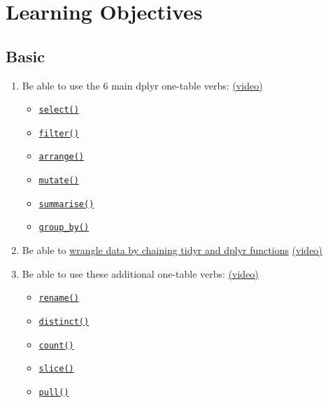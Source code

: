\documentclass[
  oneside]{book}
\providecommand{\tightlist}{%
  \setlength{\itemsep}{0pt}\setlength{\parskip}{0pt}}
\begin{document}
\hypertarget{ilo-dplyr}{%
\section{Learning Objectives}\label{ilo-dplyr}}

\hypertarget{basic-3}{%
\subsection{Basic}\label{basic-3}}

\begin{enumerate}
\def\labelenumi{\arabic{enumi}.}
\tightlist
\item
  Be able to use the 6 main dplyr one-table verbs: \href{https://youtu.be/l12tNKClTR0}{(video)}

  \begin{itemize}
  \tightlist
  \item
    \protect\hyperlink{select}{\texttt{select()}}
  \item
    \protect\hyperlink{filter}{\texttt{filter()}}
  \item
    \protect\hyperlink{arrange}{\texttt{arrange()}}
  \item
    \protect\hyperlink{mutate}{\texttt{mutate()}}
  \item
    \protect\hyperlink{summarise}{\texttt{summarise()}}
  \item
    \protect\hyperlink{group_by}{\texttt{group\_by()}}
  \end{itemize}
\item
  Be able to \protect\hyperlink{all-together}{wrangle data by chaining tidyr and dplyr functions} \href{https://youtu.be/hzFFAkwrkqA}{(video)}
\item
  Be able to use these additional one-table verbs: \href{https://youtu.be/GmfF162mq4g}{(video)}

  \begin{itemize}
  \tightlist
  \item
    \protect\hyperlink{rename}{\texttt{rename()}}
  \item
    \protect\hyperlink{distinct}{\texttt{distinct()}}
  \item
    \protect\hyperlink{count}{\texttt{count()}}
  \item
    \protect\hyperlink{slice}{\texttt{slice()}}
  \item
    \protect\hyperlink{pull}{\texttt{pull()}}
  \end{itemize}
\end{enumerate}
\end{document}
